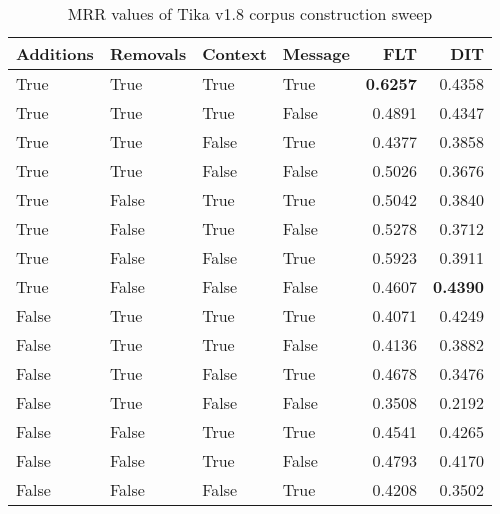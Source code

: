 
\begin{table}
\begin{spacing}{1.2}
\centering
\caption{MRR values of Tika v1.8 corpus construction sweep}
\label{table:tika_corpus_sweep}
\vspace{0.2em}
\begin{tabular}{llll|rr}
\toprule
Additions & Removals & Context & Message & FLT &       DIT \\
\midrule
     True &     True &    True &    True &     {\bf 0.6257} &       0.4358 \\
     True &     True &    True &   False &           0.4891 &       0.4347 \\
     True &     True &   False &    True &           0.4377 &       0.3858 \\
     True &     True &   False &   False &           0.5026 &       0.3676 \\
     True &    False &    True &    True &           0.5042 &       0.3840 \\
     True &    False &    True &   False &           0.5278 &       0.3712 \\
     True &    False &   False &    True &           0.5923 &       0.3911 \\
     True &    False &   False &   False &           0.4607 & {\bf 0.4390} \\
    False &     True &    True &    True &           0.4071 &       0.4249 \\
    False &     True &    True &   False &           0.4136 &       0.3882 \\
    False &     True &   False &    True &           0.4678 &       0.3476 \\
    False &     True &   False &   False &           0.3508 &       0.2192 \\
    False &    False &    True &    True &           0.4541 &       0.4265 \\
    False &    False &    True &   False &           0.4793 &       0.4170 \\
    False &    False &   False &    True &           0.4208 &       0.3502 \\
\bottomrule
\end{tabular}

\end{spacing}
\end{table}
